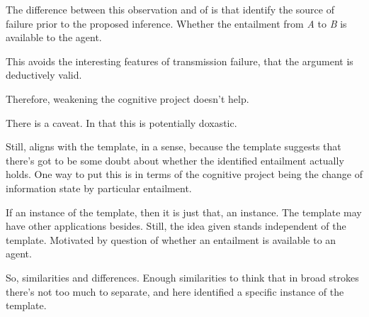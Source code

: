 \documentclass[10pt]{article}
\begin{document}
\begin{note}
  The difference between this observation and of \citeauthor{Wright:2011wn} is that identify the source of failure prior to the proposed inference.
  Whether the entailment from \emph{A} to \emph{B} is available to the agent.

  This avoids the interesting features of transmission failure, that the argument is deductively valid.
  

  Therefore, weakening the cognitive project doesn't help.

  There is a caveat.
  In that this is potentially doxastic.

  Still, aligns with the template, in a sense, because the template suggests that there's got to be some doubt about whether the identified entailment actually holds.
  One way to put this is in terms of the cognitive project being the change of information state by particular entailment.

  If an instance of the template, then it is just that, an instance.
  The template may have other applications besides.
  Still, the idea given stands independent of the template.
  Motivated by question of whether an entailment is available to an agent.

  So, similarities and differences.
  Enough similarities to think that in broad strokes there's not too much to separate, and here identified a specific instance of the template.
\end{note}
\end{document}

